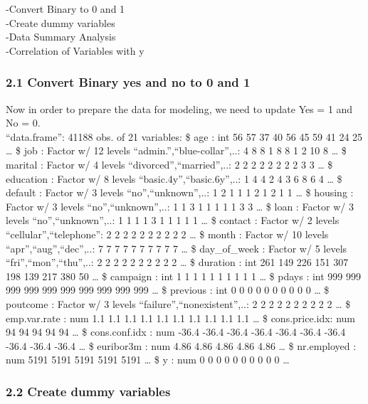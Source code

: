 \documentclass[english,man]{apa6}
\begin{document}
-Convert Binary to 0 and 1\\
-Create dummy variables\\
-Data Summary Analysis\\
-Correlation of Variables with y\\

\subsubsection{2.1 Convert Binary yes and no to 0 and
1}\label{convert-binary-yes-and-no-to-0-and-1}

Now in order to prepare the data for modeling, we need to update Yes = 1
and No = 0.\\
 \enquote{data.frame}: 41188 obs. of 21 variables: \$ age : int 56 57 37
40 56 45 59 41 24 25 \ldots{} \$ job : Factor w/ 12 levels
\enquote{admin.},\enquote{blue-collar},..: 4 8 8 1 8 8 1 2 10 8 \ldots{}
\$ marital : Factor w/ 4 levels \enquote{divorced},\enquote{married},..:
2 2 2 2 2 2 2 2 3 3 \ldots{} \$ education : Factor w/ 8 levels
\enquote{basic.4y},\enquote{basic.6y},..: 1 4 4 2 4 3 6 8 6 4 \ldots{}
\$ default : Factor w/ 3 levels \enquote{no},\enquote{unknown},..: 1 2 1
1 1 2 1 2 1 1 \ldots{} \$ housing : Factor w/ 3 levels
\enquote{no},\enquote{unknown},..: 1 1 3 1 1 1 1 1 3 3 \ldots{} \$ loan
: Factor w/ 3 levels \enquote{no},\enquote{unknown},..: 1 1 1 1 3 1 1 1
1 1 \ldots{} \$ contact : Factor w/ 2 levels
\enquote{cellular},\enquote{telephone}: 2 2 2 2 2 2 2 2 2 2 \ldots{} \$
month : Factor w/ 10 levels
\enquote{apr},\enquote{aug},\enquote{dec},..: 7 7 7 7 7 7 7 7 7 7
\ldots{} \$ day\_of\_week : Factor w/ 5 levels
\enquote{fri},\enquote{mon},\enquote{thu},..: 2 2 2 2 2 2 2 2 2 2
\ldots{} \$ duration : int 261 149 226 151 307 198 139 217 380 50
\ldots{} \$ campaign : int 1 1 1 1 1 1 1 1 1 1 \ldots{} \$ pdays : int
999 999 999 999 999 999 999 999 999 999 \ldots{} \$ previous : int 0 0 0
0 0 0 0 0 0 0 \ldots{} \$ poutcome : Factor w/ 3 levels
\enquote{failure},\enquote{nonexistent},..: 2 2 2 2 2 2 2 2 2 2 \ldots{}
\$ emp.var.rate : num 1.1 1.1 1.1 1.1 1.1 1.1 1.1 1.1 1.1 1.1 \ldots{}
\$ cons.price.idx: num 94 94 94 94 94 \ldots{} \$ cons.conf.idx : num
-36.4 -36.4 -36.4 -36.4 -36.4 -36.4 -36.4 -36.4 -36.4 -36.4 \ldots{} \$
euribor3m : num 4.86 4.86 4.86 4.86 4.86 \ldots{} \$ nr.employed : num
5191 5191 5191 5191 5191 \ldots{} \$ y : num 0 0 0 0 0 0 0 0 0 0
\ldots{}

\subsubsection{2.2 Create dummy variables}\label{create-dummy-variables}
\end{document}
